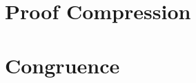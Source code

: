 \documentclass[a4paper,11pt,twoside]{article}
\theoremstyle{definition}
\theoremstyle{remark}
\begin{document}
\section{Proof Compression}
\label{sec:proofcompression}



\section{Congruence}
\label{sec:congruence}





\end{document}
